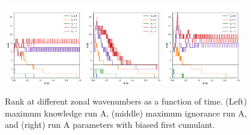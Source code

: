 \documentclass{jfm}
\begin{document}
\begin{figure}
    \centering
    \includegraphics[width=0.3\textwidth]{figs/rank_vs_t_run_A_max_knowl_kx.pdf}
    \includegraphics[width=0.3\textwidth]{figs/rank_vs_t_run_A_DSS_max_ig_kx.pdf}
    \includegraphics[width=0.3\textwidth]{figs/rank_vs_t_run_I_kx.pdf}
    \caption{Rank at different zonal wavenumbers as a function of time. (Left) maximum knowledge run A, (middle) maximum ignorance run A, and (right) run A parameters with biased first cumulant.}
    \label{fig:rank_runs}
\end{figure}


\end{document}

